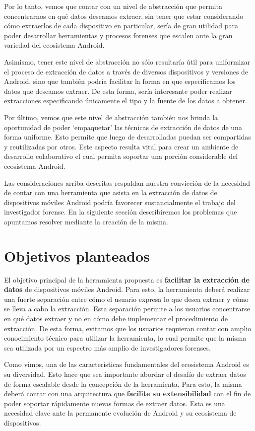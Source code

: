 Por lo tanto, vemos que contar con un nivel de abstracción que permita concentrarnos en qué datos deseamos extraer, sin tener que estar considerando cómo extraerlos de cada dispositivo en particular, sería de gran utilidad para poder desarrollar herramientas y procesos forenses que escalen ante la gran variedad del ecosistema Android.

Asimismo, tener este nivel de abstracción no sólo resultaría útil para uniformizar el proceso de extracción de datos a través de diversos dispositivos y versiones de Android, sino que también podría facilitar la forma en que especificamos los datos que deseamos extraer. De esta forma, sería interesante poder realizar extracciones especificando únicamente el tipo y la fuente de los datos a obtener.

Por último, vemos que este nivel de abstracción también nos brinda la oportunidad de poder \enquote*{empaquetar} las técnicas de extracción de datos de una forma uniforme. Esto permite que luego de desarrolladas puedan ser compartidas y reutilizadas por otros. Este aspecto resulta vital para crear un ambiente de desarrollo colaborativo el cual permita soportar una porción considerable del ecosistema Android.

Las consideraciones arriba descritas respaldan nuestra convicción de la necesidad de contar con una herramienta que asista en la extracción de datos de dispositivos móviles Android podría favorecer sustancialmente el trabajo del investigador forense. En la siguiente sección describiremos los problemas que apuntamos resolver mediante la creación de la misma.

\section{Objetivos planteados}
El objetivo principal de la herramienta propuesta es \textbf{facilitar la extracción de datos} de dispositivos móviles Android. Para esto, la herramienta deberá realizar una fuerte separación entre cómo el usuario expresa lo que desea extraer y cómo se lleva a cabo la extracción. Esta separación permite a los usuarios concentrarse en qué datos extraer y no en cómo debe implementar el procedimiento de extracción. De esta forma, evitamos que los usuarios requieran contar con amplio conocimiento técnico para utilizar la herramienta, lo cual permite que la misma sea utilizada por un espectro más amplio de investigadores forenses.

Como vimos, una de las características fundamentales del ecosistema Android es su diversidad. Esto hace que sea importante abordar el desafío de extraer datos de forma escalable desde la concepción de la herramienta. Para esto, la misma deberá contar con una arquitectura que \textbf{facilite su extensibilidad} con el fin de poder soportar rápidamente nuevas formas de extraer datos. Esta es una necesidad clave ante la permanente evolución de Android y su ecosistema de dispositivos.

